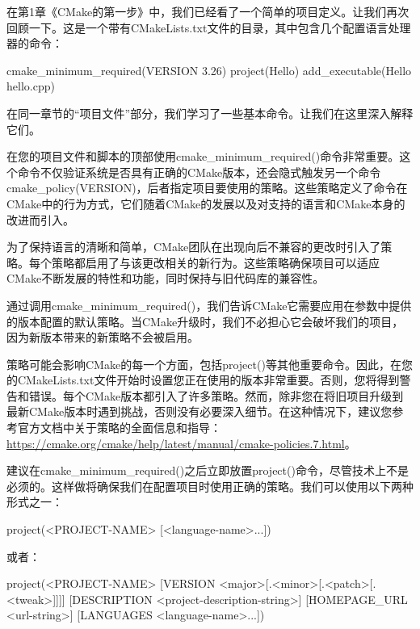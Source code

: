 在第1章《CMake的第一步》中，我们已经看了一个简单的项目定义。让我们再次回顾一下。这是一个带有CMakeLists.txt文件的目录，其中包含几个配置语言处理器的命令：


\begin{cmake}
cmake_minimum_required(VERSION 3.26)
project(Hello)
add_executable(Hello hello.cpp)
\end{cmake}

在同一章节的“项目文件”部分，我们学习了一些基本命令。让我们在这里深入解释它们。


在您的项目文件和脚本的顶部使用cmake\_minimum\_required()命令非常重要。这个命令不仅验证系统是否具有正确的CMake版本，还会隐式触发另一个命令cmake\_policy(VERSION)，后者指定项目要使用的策略。这些策略定义了命令在CMake中的行为方式，它们随着CMake的发展以及对支持的语言和CMake本身的改进而引入。

为了保持语言的清晰和简单，CMake团队在出现向后不兼容的更改时引入了策略。每个策略都启用了与该更改相关的新行为。这些策略确保项目可以适应CMake不断发展的特性和功能，同时保持与旧代码库的兼容性。

通过调用cmake\_minimum\_required()，我们告诉CMake它需要应用在参数中提供的版本配置的默认策略。当CMake升级时，我们不必担心它会破坏我们的项目，因为新版本带来的新策略不会被启用。

策略可能会影响CMake的每一个方面，包括project()等其他重要命令。因此，在您的CMakeLists.txt文件开始时设置您正在使用的版本非常重要。否则，您将得到警告和错误。每个CMake版本都引入了许多策略。然而，除非您在将旧项目升级到最新CMake版本时遇到挑战，否则没有必要深入细节。在这种情况下，建议您参考官方文档中关于策略的全面信息和指导：\url{https://cmake.org/cmake/help/latest/manual/cmake-policies.7.html}。


建议在cmake\_minimum\_required()之后立即放置project()命令，尽管技术上不是必须的。这样做将确保我们在配置项目时使用正确的策略。我们可以使用以下两种形式之一：

\begin{shell}
project(<PROJECT-NAME> [<language-name>...])
\end{shell}

或者：

\begin{shell}
project(<PROJECT-NAME>
        [VERSION <major>[.<minor>[.<patch>[.<tweak>]]]]
        [DESCRIPTION <project-description-string>]
        [HOMEPAGE_URL <url-string>]
        [LANGUAGES <language-name>...])
\end{shell}


